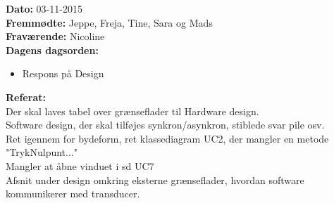 \textbf{Dato:} 03-11-2015\\

\textbf{Fremmødte:} Jeppe, Freja, Tine, Sara og Mads\\

\textbf{Fraværende:} Nicoline\\

\textbf{Dagens dagsorden:}
\begin{itemize}
	\item Respons på Design
\end{itemize}

\textbf{Referat:}\\
Der skal laves tabel over grænseflader til Hardware design.\\
Software design, der skal tilføjes synkron/asynkron, stiblede svar pile osv. \\
Ret igennem for bydeform, ret klassediagram UC2, der mangler en metode "TrykNulpunt..."\\
Mangler at åbne vinduet i sd UC7\\
Afsnit under design omkring eksterne grænseflader, hvordan software kommunikerer med transducer.\\
